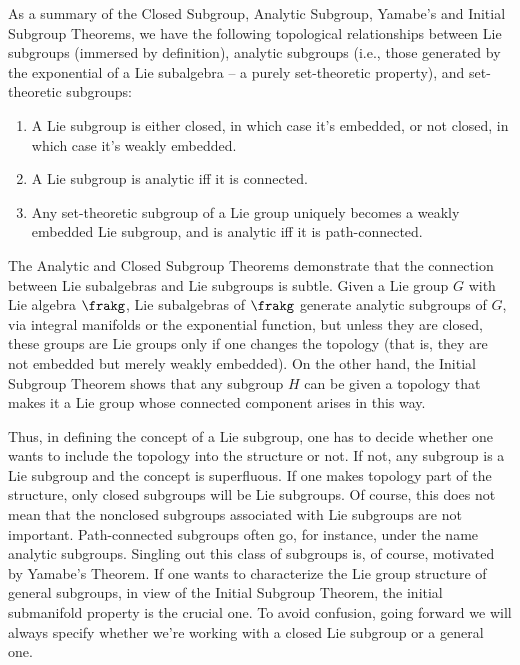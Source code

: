 \begin{rem}
    As a summary of the Closed Subgroup, Analytic Subgroup, Yamabe's and Initial Subgroup Theorems, we have the following topological relationships between Lie subgroups (immersed by definition), analytic subgroups (i.e., those generated by the exponential of a Lie subalgebra -- a purely set-theoretic property), and set-theoretic subgroups:
    \begin{enumerate}
        \item A Lie subgroup is either closed, in which case it's embedded, or not closed, in which case it's weakly embedded.
        \item A Lie subgroup is analytic iff it is connected.
        \item Any set-theoretic subgroup of a Lie group uniquely becomes a weakly embedded Lie subgroup, and is analytic iff it is path-connected.
    \end{enumerate}
    The Analytic and Closed Subgroup Theorems demonstrate that the connection between Lie subalgebras and Lie subgroups is subtle. Given a Lie group $G$ with Lie algebra $\frakg$, Lie subalgebras of $\frakg$ generate analytic subgroups of $G$, via integral manifolds or the exponential function, but unless they are closed, these groups are Lie groups only if one changes the topology (that is, they are not embedded but merely weakly embedded). On the other hand,  the Initial Subgroup Theorem shows that any subgroup $H$ can be given a topology that makes it a Lie group whose connected component arises in this way. 
    
    Thus, in defining the concept of a Lie subgroup, one has to decide whether one wants to include the topology into the structure or not. If not, any subgroup is a Lie subgroup and the concept is superfluous. If one makes topology part of the structure, only closed subgroups will be Lie subgroups. Of course, this does not mean that the nonclosed subgroups associated with Lie subgroups are not important. Path-connected subgroups often go, for instance, under the name analytic subgroups. Singling out this class of subgroups is, of course, motivated by Yamabe's Theorem. If one wants to characterize the Lie group structure of general subgroups, in view of the Initial Subgroup Theorem, the initial submanifold property is the crucial one. To avoid confusion, going forward we will always specify whether we're working with a closed Lie subgroup or a general one.
\end{rem}

